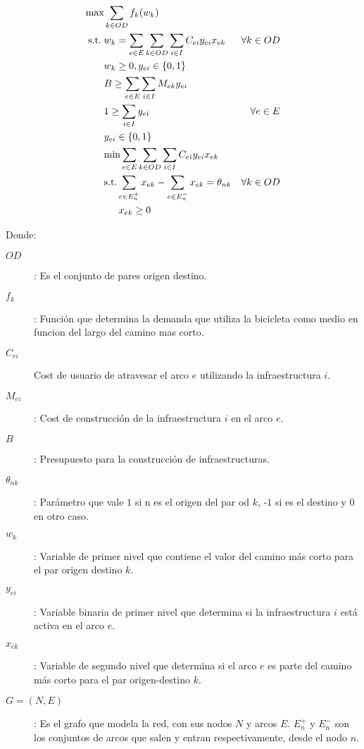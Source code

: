 \documentclass{article}
\begin{document}
  \begin{align}
    \text{max}    & \sum_{k \in OD} f_k(w_k)                                      & \label{eq:objective1lvl} \\
    \text{s.t.}\; & w_k = \sum_{e \in E} \sum_{k \in OD} \sum_{i \in I} C_{ei}y_{ei}x_{ek} & \forall k \in OD \label{eq:shortestpath} \\
                  & w_k \geq 0, y_{ei} \in \left\{ 0, 1 \right\}      & \nonumber \\
                  & B \geq \sum_{e \in E} \sum_{i \in I} M_{ek}y_{ei} & \label{eq:respectbudget} \\
                  & 1 \geq \sum_{i \in I} y_{ei}                      & \forall e \in E \label{eq:atmostoney} \\
                  & y_{ei} \in \left\{0, 1\right\} & \nonumber \\
                  & \text{min} \sum_{e \in E} \sum_{k \in OD} \sum_{i \in I} C_{ei}y_{ei}x_{ek} & \label{eq:subproblem} \\
                  & \text{s.t.} \sum_{e \in E_n^+} x_{ek} - \sum_{e \in E_n^-} x_{ek} = \theta_{nk}  & \forall k \in OD \label {eq:flowbalance} \\
                  & \hspace{1.5em} x_{ek} \geq 0  & \nonumber
  \end{align}

  Donde:

  \begin{description}
    \item[$OD$]: Es el conjunto de pares origen destino.
    \item[$f_k$]: Función que determina la demanda que utiliza la bicicleta como medio en funcion del largo del camino mas corto.
    \item[$C_{ei}$] Cost de usuario de atravesar el arco $e$ utilizando la infraestructura $i$.
    \item[$M_{ei}$]: Cost de construcción de la infraestructura $i$ en el arco $e$.
    \item[$B$]: Presupuesto para la construcción de infraestructuras.
    \item[$\theta_{nk}$]: Parámetro que vale $1$ si n es el origen del par od $k$, -$1$ si es el destino y $0$ en otro caso.
    \item[$w_k$]: Variable de primer nivel que contiene el valor del camino más corto para el par origen destino $k$.
    \item[$y_{ei}$]: Variable binaria de primer nivel que determina si la infraestructura $i$ está activa en el arco $e$.
    \item[$x_{ek}$]: Variable de segundo nivel que determina si el arco $e$ es parte del camino más corto para el par origen-destino $k$.
    \item[$G=(N,E)$]: Es el grafo que modela la red, con sus nodos $N$ y arcos $E$. $E_n^+$ y $E_n^-$ son los conjuntos de arcos que salen y entran respectivamente, desde el nodo $n$.
  \end{description}
\end{document}
